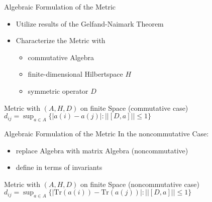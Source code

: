\documentclass[fleqn]{beamer}
\begin{document}
    \begin{frame}{Algebraic Formulation of the Metric}
        \begin{itemize}
        \item Utilize results of the Gelfand-Naimark Theorem
        \item Characterize the Metric with\\
            \begin{itemize}
                \item[\bullet] commutative Algebra
                \item[\bullet] finite-dimensional Hilbertspace $H$
                \item[\bullet] symmetric operator $D$
            \end{itemize}
        \end{itemize}
        \begin{block}{Metric with $(A, H, D)$ on finite Space (commutative case)}
            \centering
            $d_{ij} = \sup_{a \in A}\{ |a(i) - a(j)| : ||[D, a]|| \leq 1\}$
        \end{block}
    \end{frame}

    \begin{frame}{Algebraic Formulation of the Metric}
     In the noncommutative Case:
        \begin{itemize}
            \item replace Algebra with matrix Algebra (noncommutative)
            \item define in terms of invariants
        \end{itemize}
        \begin{block}{Metric with $(A, H, D)$ on finite Space (noncommutative case)}
            \centering
            $d_{ij} = \sup_{a \in A}\{ |\text{Tr}(a(i)) - \text{Tr}(a(j))| :||[D, a]|| \leq 1\}$
        \end{block}
    \end{frame}
\end{document}

